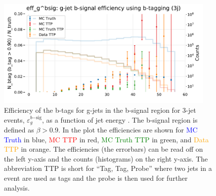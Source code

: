 \documentclass[a4paper, twoside, nobib]{tufte-book}
\newcommand{\code}[1]{\colorbox{light-gray}{\texttt{\detokenize{#1}}}}
\newcommand{\q}[1]{``#1''}
\begin{document}
\begin{figure}
  \includegraphics[width=0.95\textwidth, trim=0 0 0 30, clip]{figures/quarks/eff_g_bsig-down_sample=1.00-ML_vars=vertex-selection=b-ejet_min=4-n_iter_RS_lgb=99-n_iter_RS_xgb=9-cdot_cut=0.90-version=19.pdf}
  \caption[b-Tagging Efficiency $\varepsilon_g^{b\mathrm{-sig}}$ as a function of jet energy]
          {Efficiency of the b-tags for g-jets in the b-signal region for 3-jet events, $\varepsilon_g^{b\mathrm{-sig}}$, as a function of jet energy \code{Ejet}. The b-signal region is defined as $\beta > 0.9$. In the plot the efficiencies are shown for \textcolor{blue}{MC Truth} in blue, \textcolor{red}{MC TTP} in red, \textcolor{green}{MC Truth TTP} in green, and \textcolor{orange}{Data TTP} in orange. The efficiencies (the errorbars) can be read off on the left y-axis and the counts (histograms) on the right y-axis. The abbreviation TTP is short for \q{Tag, Tag, Probe} where two jets in a event are used as tags and the probe is then used for further analysis.  
          } 
  \label{fig:q:effiency_btag_gjet_bsig}
\end{figure}
\end{document}
